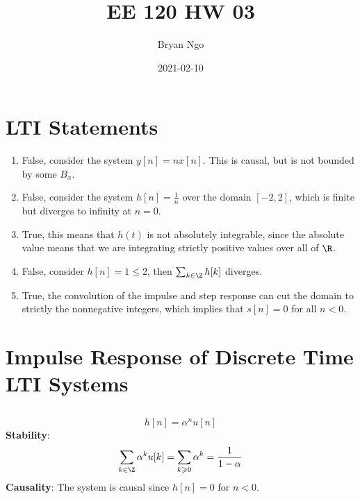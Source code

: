 \documentclass{article}
\title{EE 120 HW 03}
\author{Bryan Ngo}
\date{2021-02-10}
\begin{document}
\maketitle

\section{LTI Statements}

\begin{enumerate}
    \item False, consider the system \(y[n] = nx[n]\). This is causal, but is not bounded by some \(B_x\).
    \item False, consider the system \(h[n] = \frac{1}{n}\) over the domain \([-2, 2]\), which is finite but diverges to infinity at \(n = 0\).
    \item True, this means that \(h(t)\) is not absolutely integrable, since the absolute value means that we are integrating strictly positive values over all of \(\R\).
    \item False, consider \(h[n] = 1 \leqslant 2\), then \(\sum_{k \in \Z} h[k]\) diverges.
    \item True, the convolution of the impulse and step response can cut the domain to strictly the nonnegative integers, which implies that \(s[n] = 0\) for all \(n < 0\).
\end{enumerate}

\section{Impulse Response of Discrete Time LTI Systems}

\subsection{}

\begin{equation}
    h[n] = \alpha^n u[n]
\end{equation}
\textbf{Stability}:
\begin{equation}
    \sum_{k \in \Z} \alpha^k u[k] = \sum_{k \geqslant 0} \alpha^k = \frac{1}{1 - \alpha}
\end{equation}
\textbf{Causality}: The system is causal since \(h[n] = 0\) for \(n < 0\).

\subsection{}
\end{document}
